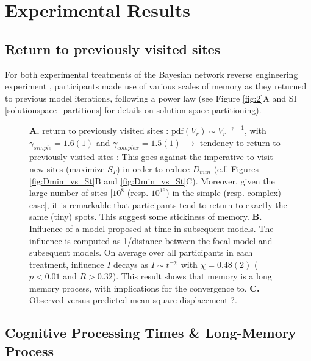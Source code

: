 \section{Experimental Results}

\subsection{Return to previously visited sites}
For both experimental treatments of the Bayesian network reverse engineering experiment \cite{castnerForthcoming}, participants made use of various scales of memory as they returned to previous model iterations, following a power law (see Figure \ref{fig:2}A and SI \ref{solutionspace_partitions} for details on solution space partitioning).\\

\begin{figure}[h!]
\begin{center}
\caption{\footnotesize{{\bf A.} return to previously visited sites : $\mathrm{pdf}(V_r) \sim {V_r}^{- \gamma -1}$, with $\gamma_{simple} = 1.6(1)$ and $\gamma_{complex} = 1.5(1)$ $\rightarrow$ tendency to return to previously visited sites : This goes against the imperative to visit new sites (maximize $S_T$) in order to reduce $D_{min}$ (c.f. Figures \ref{fig:Dmin_vs_St}B and \ref{fig:Dmin_vs_St}C). Moreover, given the large number of sites [$10^{8}$ (resp. $10^{16}$) in the simple (resp. complex) case], it is remarkable that participants tend to return to exactly the same (tiny) spots. This suggest some stickiness of memory. {\bf B.} Influence of a model proposed at time in subsequent models. The influence is computed as 1/distance between the focal model and subsequent models. On average over all participants in each treatment, influence $I$ decays as $I \sim t^{-\chi}$ with $\chi = 0.48(2)$ ($p < 0.01$ and $R > 0.32$). This result shows that memory is a long memory process, with implications for the convergence to. {\bf C.} Observed versus predicted mean square displacement ?.}}
\label{fig:3}
\end{center}
\end{figure}

\subsection{Cognitive Processing Times \& Long-Memory Process}


